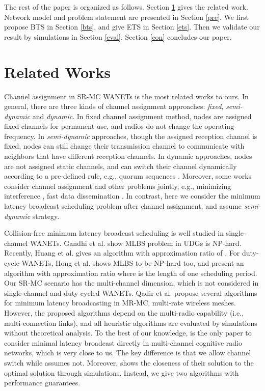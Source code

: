 \documentclass[10pt, conference]{IEEEtran}
\begin{document}
The rest of the paper is organized as follows. Section \ref{rw}
gives the related work. Network model and problem statement are
presented in Section \ref{pre}. We first propose BTS in Section
\ref{bts}, and give ETS in Section \ref{ets}. Then we validate
our result by simulations in Section \ref{eval}. Section
\ref{con} concludes our paper.

\section{Related Works} \label{rw}
Channel assignment in SR-MC WANETs is the most related works to
ours. In general, there are three kinds of channel assignment
approaches: \emph{fixed}, \emph{semi-dynamic} and
\emph{dynamic}. In fixed channel assignment method, nodes are
assigned fixed channels for permanent use, and radios do not
change the operating frequency. In \emph{semi-dynamic}
approaches, though the assigned reception channel is fixed,
nodes can still change their transmission channel to
communicate with neighbors that have different reception
channels. In dynamic approaches, nodes are not assigned static
channels, and can switch their channel dynamically according to
a pre-defined rule, e.g., quorum sequences \cite{Quorum}.
Moreover, some works consider channel assignment and other
problems jointly, e.g., minimizing interference
\cite{component}, fast data dissemination \cite{TON09}. In
contrast, here we consider the minimum latency broadcast
scheduling problem after channel assignment, and assume
\emph{semi-dynamic} strategy.

Collision-free minimum latency broadcast scheduling is well
studied in single-channel WANETs. Gandhi et al. \cite{UDG} show
MLBS problem in UDGs is NP-hard. Recently, Huang et al.
\cite{info09} gives an algorithm with approximation ratio of
. For duty-cycle WANETs, Hong et al. \cite{ICC09} shows
MLBS to be NP-hard too, and present an algorithm with
approximation ratio  where  is the length of one
scheduling period. Our SR-MC scenario has the multi-channel
dimension, which is not considered in single-channel and
duty-cycled WANETs. Qadir et al. \cite{MR-MC} propose several
algorithms for minimum latency broadcasting in MR-MC,
multi-rate wireless meshes. However, the proposed algorithms
depend on the multi-radio capability (i.e., multi-connection
links), and all heuristic algorithms are evaluated by
simulations without theoretical analysis. To the best of our
knowledge, \cite{ICDCN10} is the only paper to consider minimal
latency broadcast directly in multi-channel cognitive radio
networks, which is very close to us. The key difference is that
we allow channel switch while \cite{ICDCN10} assumes not.
Moreover, \cite{ICDCN10} shows the closeness of their solution
to the optimal solution through simulations. Instead, we give
two algorithms with performance guarantees.
\end{document}
